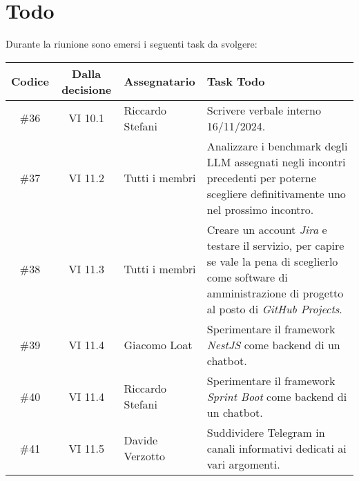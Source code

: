 
\section{Todo}

Durante la riunione sono emersi i seguenti task da svolgere:

\vspace{0.5cm}

\begin{table}[htbp]
\centering
{}
\begin{tabular}{|c|c|p{}|p{}|}
    \hline
    \rowcolor[gray]{0.75}
    \textbf{Codice} & \textbf{Dalla decisione} & \textbf{Assegnatario} & \textbf{Task Todo} \\
    \hline
    \#36 & VI 10.1 & Riccardo Stefani & Scrivere verbale interno 16/11/2024. \\
    \hline
    \#37 & VI 11.2 & Tutti i membri & Analizzare i benchmark degli LLM assegnati negli incontri precedenti per poterne scegliere definitivamente uno 
    nel prossimo incontro. \\
    \hline
    \#38 & VI 11.3 & Tutti i membri & Creare un account \emph{Jira} e testare il servizio, per capire se vale la pena di sceglierlo come 
    software di amministrazione di progetto al posto di \emph{GitHub Projects}. \\
    \hline
    \#39 & VI 11.4 & Giacomo Loat & Sperimentare il framework \emph{NestJS} come backend di un chatbot. \\
    \hline
    \#40 & VI 11.4 & Riccardo Stefani & Sperimentare il framework \emph{Sprint Boot} come backend di un chatbot. \\
    \hline
    \#41 & VI 11.5 & Davide Verzotto & Suddividere Telegram in canali informativi dedicati ai vari argomenti. \\
    \hline
\end{tabular}
\end{table}